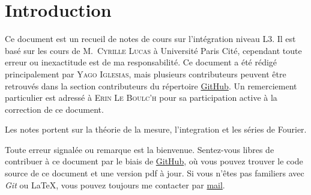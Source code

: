 \section{Introduction}

Ce document est un recueil de notes de cours sur l'intégration niveau L3. Il est
basé sur les cours de M.~\textsc{Cyrille Lucas} à Université Paris Cité, cependant toute
erreur ou inexactitude est de ma responsabilité.
Ce document a été rédigé principalement par \textsc{Yago Iglesias}, mais plusieurs contributeurs
peuvent être retrouvés dans la section contributeurs du répertoire
\href{https://github.com/Yag000/integration-notes/graphs/contributors}{GitHub}. Un remerciement
particulier est adressé à \textsc{Erin Le Boulc’h} pour sa participation active à la correction
de ce document.
\vspace{0.5cm}

Les notes portent sur la théorie de la mesure, l'integration et les séries de Fourier.
\vspace{0.5cm}

Toute erreur signalée ou remarque est la bienvenue.
Sentez-vous libres de contribuer à ce document par le biais de \href{https://github.com/Yag000/integration-notes}{GitHub},
où vous pouvez trouver le code source de ce document et une version pdf à jour.
Si vous n'êtes pas familiers avec \textit{Git} ou \LaTeX, vous pouvez toujours me contacter
par \href{mailto: yago.iglesias.vazquez@gmail.com}{mail}.









